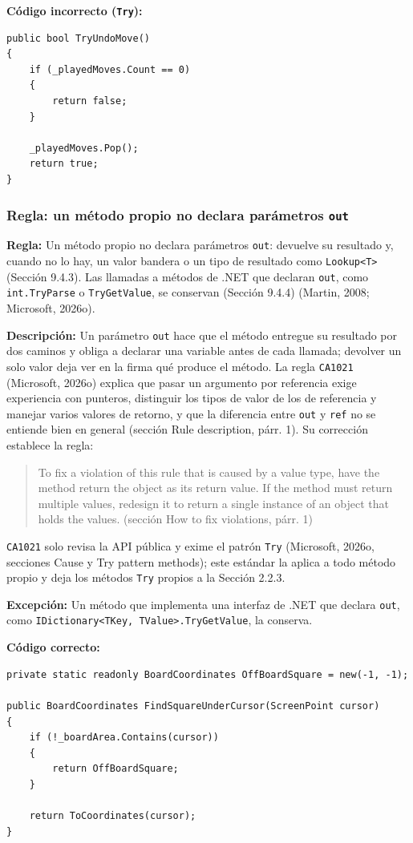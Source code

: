 \textbf{Código incorrecto (\texttt{Try}):}
\begin{lstlisting}[style=csharpstyle]
public bool TryUndoMove()
{
    if (_playedMoves.Count == 0)
    {
        return false;
    }

    _playedMoves.Pop();
    return true;
}
\end{lstlisting}

\subsubsection{Regla: un método propio no declara parámetros \texttt{out}}

\textbf{Regla:} Un método propio no declara parámetros \texttt{out}: devuelve su resultado y, cuando no lo hay, un valor bandera o un tipo de resultado como \texttt{Lookup<T>} (Sección 9.4.3). Las llamadas a métodos de .NET que declaran \texttt{out}, como \texttt{int.TryParse} o \texttt{TryGetValue}, se conservan (Sección 9.4.4) (Martin, 2008; Microsoft, 2026o).

\textbf{Descripción:} Un parámetro \texttt{out} hace que el método entregue su resultado por dos caminos y obliga a declarar una variable antes de cada llamada; devolver un solo valor deja ver en la firma qué produce el método. La regla \texttt{CA1021} (Microsoft, 2026o) explica que pasar un argumento por referencia exige experiencia con punteros, distinguir los tipos de valor de los de referencia y manejar varios valores de retorno, y que la diferencia entre \texttt{out} y \texttt{ref} no se entiende bien en general (sección Rule description, párr. 1). Su corrección establece la regla:
\begin{quote}
To fix a violation of this rule that is caused by a value type, have the method return the object as its return value. If the method must return multiple values, redesign it to return a single instance of an object that holds the values. (sección How to fix violations, párr. 1)
\end{quote}
\noindent \texttt{CA1021} solo revisa la API pública y exime el patrón \texttt{Try} (Microsoft, 2026o, secciones Cause y Try pattern methods); este estándar la aplica a todo método propio y deja los métodos \texttt{Try} propios a la Sección 2.2.3.

\textbf{Excepción:} Un método que implementa una interfaz de .NET que declara \texttt{out}, como \texttt{IDictionary<TKey, TValue>.TryGetValue}, la conserva.

\textbf{Código correcto:}
\begin{lstlisting}[style=csharpstyle]
private static readonly BoardCoordinates OffBoardSquare = new(-1, -1);

public BoardCoordinates FindSquareUnderCursor(ScreenPoint cursor)
{
    if (!_boardArea.Contains(cursor))
    {
        return OffBoardSquare;
    }

    return ToCoordinates(cursor);
}
\end{lstlisting}

